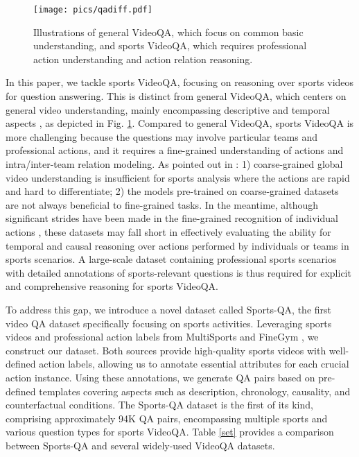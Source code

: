 {\begin{figure}[tbp]
\centering
\texttt{[image: pics/qadiff.pdf]}
\caption{
Illustrations of general VideoQA, which focus on common basic understanding, and sports VideoQA, which requires professional action understanding and action relation reasoning\protect\footnotemark. 
}
\label{qadiff}
\end{figure}



In this paper, we tackle sports VideoQA, focusing on reasoning over sports videos for question answering. This is distinct from general VideoQA, which centers on general video understanding, mainly encompassing descriptive and temporal aspects \citep{jang2017tgif, xu2017video, xiao2021next, yu2019activitynet}, as depicted in Fig. \ref{qadiff}. %
Compared to general VideoQA, sports VideoQA is more challenging because the questions may involve particular teams and professional actions, and it requires a fine-grained understanding of actions and intra/inter-team relation modeling. %
As pointed out in \citep{shao2020finegym}: 1) coarse-grained global video understanding is insufficient for sports analysis where the actions are rapid and hard to differentiate; 2) the models pre-trained on coarse-grained datasets are not always beneficial to fine-grained tasks. 
In the meantime, although significant strides have been made in the fine-grained recognition of individual actions \citep{shao2020finegym,liu2022fineaction,sun2017taichi}, these datasets may fall short in effectively evaluating the ability for temporal and causal reasoning over actions performed by individuals or teams in sports scenarios.
A large-scale dataset containing professional sports scenarios with detailed annotations of sports-relevant questions is thus required for explicit and comprehensive reasoning for sports VideoQA.

To address this gap, we introduce a novel dataset called Sports-QA, the first video QA dataset specifically focusing on sports activities. Leveraging sports videos and professional action labels from MultiSports \citep{li2021multisports} and FineGym \citep{shao2020finegym}, we construct our dataset. Both sources provide high-quality sports videos with well-defined action labels, allowing us to annotate essential attributes for each crucial action instance. Using these annotations, we generate QA pairs based on pre-defined templates covering aspects such as description, chronology, causality, and counterfactual conditions. The Sports-QA dataset is the first of its kind, comprising approximately 94K QA pairs, encompassing multiple sports and various question types for sports VideoQA. Table \ref{set} provides a comparison between Sports-QA and several widely-used VideoQA datasets.

}
